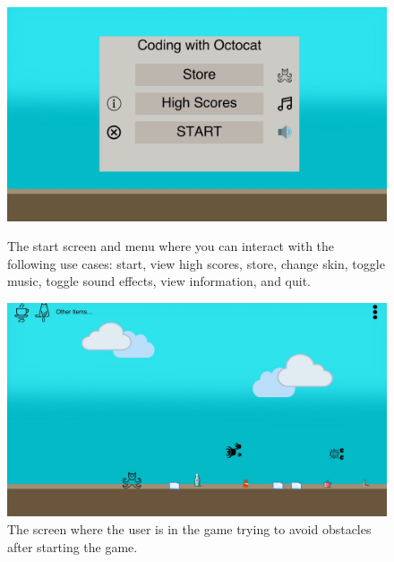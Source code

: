 \documentclass[10pt,conference,onecolumn,compsoc]{IEEEtran}
\begin{document}
\begin{figure}[!ht] 
\centering
\includegraphics[scale=.2]{MockupStartScreen.jpeg}
\caption{The start screen and menu where you can interact with the following use cases: start, view high scores, store, change skin, toggle music, toggle sound effects, view information, and quit.}

\includegraphics[scale=.2]{MockupIngame.jpeg}
\caption{The screen where the user is in the game trying to avoid obstacles after starting the game. }
\end{figure}
\end{document}
